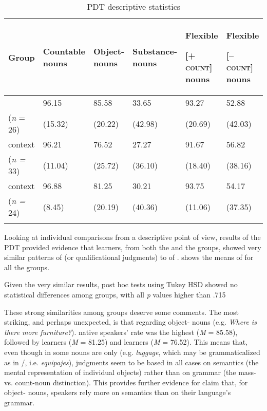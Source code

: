 \documentclass[output=paper]{langsci/langscibook}
\begin{document}
\begin{table}
\caption{PDT descriptive statistics}
\label{tab:thomas:7}
\small
\begin{tabularx}{\textwidth}{QYYYYY}
\lsptoprule
\bfseries Group & \bfseries Countable nouns & \bfseries Object- nouns & {\bfseries Substance- nouns} & {\bfseries Flexible} 

\bfseries [\textsc{+ count}] nouns & {{\bfseries Flexible}

\bfseries [\textsc{– count}] nouns}\\
\midrule
{} & 96.15 & {85.58} & 33.65 & {93.27} & 52.88\\
(\textit{n} = 26) & (15.32) & {(20.22)} & (42.98) & {(20.69)} & (42.03)\\
 context & 96.21 & {76.52} & 27.27 & {91.67} & 56.82\\
(\textit{n =} 33) & (11.04) & {(25.72)} & (36.10) & {(18.40)} & (38.16)\\
 context & 96.88 & {81.25} & 30.21 & {93.75} & 54.17\\
(\textit{n =} 24) & (8.45) & {(20.19)} & (40.36) & {(11.06)} & (37.35)\\
\lspbottomrule
\end{tabularx}
\end{table}

Looking at individual comparisons from a descriptive point of view, results of the PDT provided evidence that   learners, from both the  and the  groups, showed very similar patterns of  (or qualificational judgments) to  of .   shows the means of  for all the groups.  

Given the very similar results, post hoc tests using Tukey HSD showed no statistical differences among groups, with all \textit{p} values higher than .715 

These strong similarities among groups deserve some comments. The most striking, and perhaps unexpected, is that regarding object- nouns (e.g. \textit{Where is there more furniture?}).  native speakers’  rate was the highest (\textit{M} = 85.58), followed by  learners  (\textit{M} = 81.25) and  learners (\textit{M} = 76.52). This means that, even though in  some nouns are  only (e.g. \textit{luggage}, which may be grammaticalized as  in /, i.e. \textit{equipajes}), judgments seem to be based in all cases on semantics (the mental representation of individual objects) rather than on grammar (the mass- vs. count-noun distinction). This provides further evidence for  claim that, for object- nouns,  speakers rely more on semantics than on their language’s grammar. 
\end{document}
